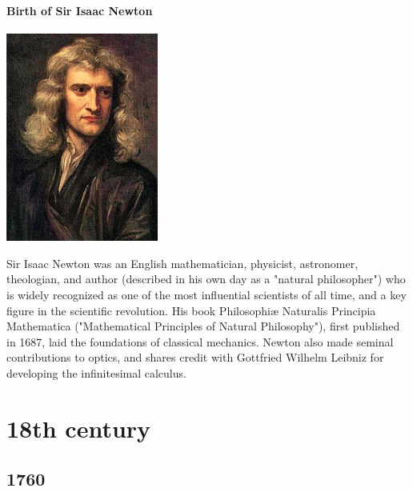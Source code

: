 \documentclass[11pt]{report}
\begin{document}
\subsection{Birth of Sir Isaac Newton}
\vspace{2mm}\begin{center}\includegraphics[width=5cm]{./img/isaacNewton.jpg}\end{center}
Sir Isaac Newton was an English mathematician, physicist, astronomer, theologian, and author (described in his own day as a "natural philosopher") who is widely recognized as one of the most influential scientists of all time, and a key figure in the scientific revolution. His book Philosophiæ Naturalis Principia Mathematica ("Mathematical Principles of Natural Philosophy"), first published in 1687, laid the foundations of classical mechanics. Newton also made seminal contributions to optics, and shares credit with Gottfried Wilhelm Leibniz for developing the infinitesimal calculus.


										
\part{18th century}
\chapter{1760}
\end{document}
